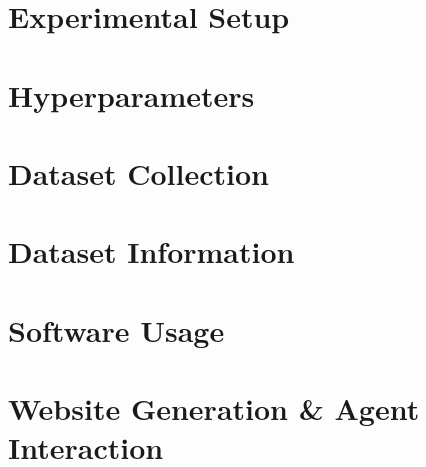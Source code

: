 

\section{Experimental Setup}
\label{appendix:experimental_setup}


\section{Hyperparameters}
\label{appendix:hyperparameters}




\section{Dataset Collection}
\label{appendix:dataset_collection}



\section{Dataset Information}
\label{appendix:dataset_information}



\section{Software Usage}
\label{appendix:software_usage}



\section{Website Generation \& Agent Interaction}
\label{appendix:website_generation}



